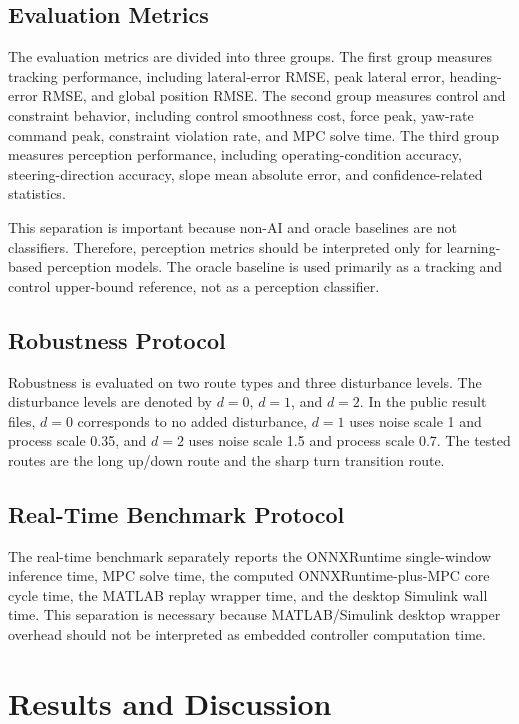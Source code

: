 \documentclass{ieeeaccess}
\begin{document}
\subsection{Evaluation Metrics}

The evaluation metrics are divided into three groups. The first group measures tracking performance, including lateral-error RMSE, peak lateral error, heading-error RMSE, and global position RMSE. The second group measures control and constraint behavior, including control smoothness cost, force peak, yaw-rate command peak, constraint violation rate, and MPC solve time. The third group measures perception performance, including operating-condition accuracy, steering-direction accuracy, slope mean absolute error, and confidence-related statistics.

This separation is important because non-AI and oracle baselines are not classifiers. Therefore, perception metrics should be interpreted only for learning-based perception models. The oracle baseline is used primarily as a tracking and control upper-bound reference, not as a perception classifier.

\subsection{Robustness Protocol}

Robustness is evaluated on two route types and three disturbance levels. The disturbance levels are denoted by $d=0$, $d=1$, and $d=2$. In the public result files, $d=0$ corresponds to no added disturbance, $d=1$ uses noise scale 1 and process scale 0.35, and $d=2$ uses noise scale 1.5 and process scale 0.7. The tested routes are the long up/down route and the sharp turn transition route.

\subsection{Real-Time Benchmark Protocol}

The real-time benchmark separately reports the ONNXRuntime single-window inference time, MPC solve time, the computed ONNXRuntime-plus-MPC core cycle time, the MATLAB replay wrapper time, and the desktop Simulink wall time. This separation is necessary because MATLAB/Simulink desktop wrapper overhead should not be interpreted as embedded controller computation time.

\section{Results and Discussion}
\end{document}
